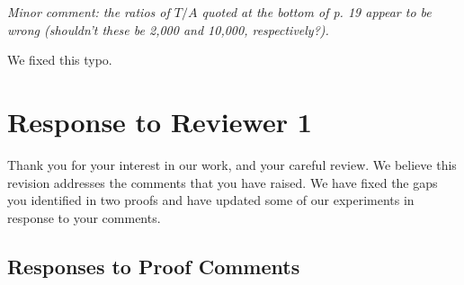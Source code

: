 \documentclass[11pt]{article}
\newcommand{\1}{\ensuremath{\mathbf{1}}} %
\theoremstyle{thm-sf}
\begin{document}
	{\it Minor comment: the ratios of $T/A$ quoted at the bottom of p. 19 appear to be wrong (shouldn't these be 2,000 and 10,000, respectively?).}
	
	We fixed this typo.
	
	\newpage
	\section{Response to  Reviewer 1}
	
	Thank you for your interest in our work, and your careful review. We believe this revision addresses the comments that you have raised. We have fixed the gaps you identified in two proofs and have updated some of our experiments in response to your comments.  
	
	\subsection{Responses to Proof Comments}
	
\end{document}
